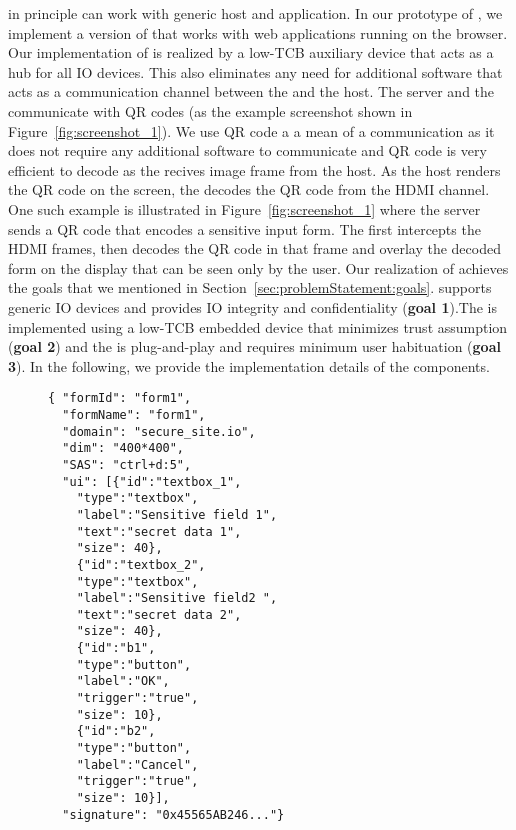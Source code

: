  \name in principle can work with generic host and application. In our prototype of \name, we implement a version of \name that works with web applications running on the browser. Our implementation of \name is realized by a low-TCB auxiliary device that acts as a hub for all IO devices. This also eliminates any need for additional software that acts as a communication channel between the \device and the host. The server and the \device communicate with QR codes (as the example screenshot shown in Figure~\ref{fig:screenshot_1}). We use QR code a a mean of a communication as it does not require any additional software to communicate and QR code is very efficient to decode as the \device recives image frame from the host. As the host renders the QR code on the screen, the \device decodes the QR code from the HDMI channel. One such example is illustrated in Figure~\ref{fig:screenshot_1} where the server sends a QR code that encodes a sensitive input form. The \device first intercepts the HDMI frames, then decodes the QR code in that frame and overlay the decoded form on the display that can be seen only by the user. Our realization of \name achieves the goals that we mentioned in Section~\ref{sec:problemStatement:goals}. \name supports generic IO devices and provides IO integrity and confidentiality (\textbf{goal 1}).The \device is implemented using a low-TCB embedded device that minimizes trust assumption (\textbf{goal 2}) and the \device is plug-and-play and requires minimum user habituation (\textbf{goal 3}). In the following, we provide the implementation details of the \name components.



\begin{figure}[t]
\begin{lstlisting}[mathescape=true]
{ "formId": "form1",
  "formName": "form1",
  "domain": "secure_site.io",
  "dim": "400*400",
  "SAS": "ctrl+d:5",
  "ui": [{"id":"textbox_1",
  	"type":"textbox",
	"label":"Sensitive field 1",
	"text":"secret data 1",
	"size": 40},
	{"id":"textbox_2",
	"type":"textbox",
	"label":"Sensitive field2 ",
	"text":"secret data 2",
	"size": 40},
	{"id":"b1",
	"type":"button",
	"label":"OK",
	"trigger":"true",
	"size": 10},	
	{"id":"b2",
	"type":"button",
	"label":"Cancel",
	"trigger":"true",
	"size": 10}],
  "signature": "0x45565AB246..."}
\end{lstlisting}
\end{figure}

